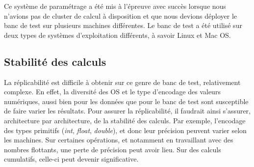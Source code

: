 Ce système de paramétrage a été mis à l'épreuve avec succès lorsque nous n'avions pas de cluster de calcul à disposition et que nous devions déployer le banc de test sur plusieurs machines différentes. Le banc de test a été utilisé sur deux types de systèmes d'exploitation différents, à savoir Linux et Mac OS.

\begin{table}[!t]
    \caption{ Tableau récapitulant les propriétés de notre banc de test. Bien que reproductibles, certaines étapes nécessitent une modification manuelle en fonction des bases de données. Les * signifient que les résultats sont répétables dans le cas où l'on définit à l'avance les graines des générateurs aléatoires }
    \label{ tab:reproductibility }
\end{table}

\subsection{Stabilité des calculs} 

La réplicabilité est difficile à obtenir sur ce genre de banc de test, relativement complexe. En effet, la diversité des OS et le type d'encodage des valeurs numériques, aussi bien pour les données que pour le banc de test sont susceptible de faire varier les résultats. Pour assurer la réplicabilité, il faudrait ainsi s'assurer, architecture par architecture, de la stabilité des calculs. Par exemple, l'encodage des types primitifs (\textit{int}, \textit{float}, \textit{double}), et donc leur précision peuvent varier selon les machines. Sur certaines opérations, et notamment en travaillant avec des nombres flottants, une perte de précision peut avoir lieu. Sur des calculs cumulatifs, celle-ci peut devenir significative.

